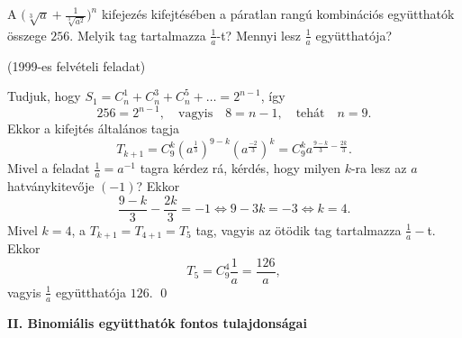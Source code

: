 \begin{problem}
A ${\displaystyle \Big(\sqrt[3]{a}+\frac{1}{\sqrt[3]{a^{2}}}\Big)^{n}}$
kifejezés kifejtésében a páratlan rangú kombinációs együtthatók összege
$256$. Melyik tag tartalmazza $\frac{1}{a}$-t? Mennyi lesz $\frac{1}{a}$
együtthatója? 
\begin{flushright}
(1999-es felvételi feladat) 
\par\end{flushright}
\end{problem}
\begin{solution}
Tudjuk, hogy $S_{1}=C_{n}^{1}+C_{n}^{3}+C_{n}^{5}+\ldots=2^{n-1}$,
így 
\[
256=2^{n-1},\quad\text{vagyis}\quad8=n-1,\quad\text{tehát}\quad n=9.
\]
Ekkor a kifejtés általános tagja 
\[
{\displaystyle T_{k+1}=C_{9}^{k}(a^{\frac{1}{3}})^{9-k}(a^{\frac{-2}{3}})^{k}=C_{9}^{k}a^{\frac{9-k}{3}-\frac{2k}{3}}.}
\]
Mivel a feladat $\frac{1}{a}=a^{-1}$ tagra kérdez rá, kérdés, hogy
milyen $k$-ra lesz az $a$ hatványkitevője $(-1)$? Ekkor 
\[
\frac{9-k}{3}-\frac{2k}{3}=-1\iff9-3k=-3\iff k=4.
\]
Mivel $k=4$, a $T_{k+1}=T_{4+1}=T_{5}$ tag, vagyis az ötödik tag
tartalmazza $\frac{1}{a}-$t. Ekkor 
\[
T_{5}=C_{9}^{4}\frac{1}{a}=\frac{126}{a},
\]
vagyis $\frac{1}{a}$ együtthatója $126$. \qed 
\end{solution}
\vspace{0.5cm}

\textbf{II. Binomiális együtthatók fontos tulajdonságai}

\vspace{0.3cm}

